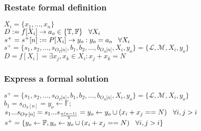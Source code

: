 \documentclass[11pt]{article}
\begin{document}
\subsubsection{Restate formal definition}
\begin{center}
\vspace{1.5mm}
$
X_i = \{x_1,...,x_n\}
$
\\ \vspace{2mm}
$
D := f \lbrack X_i \rbrack \rightarrow a_{o} \in \{\mathbb{T}, \mathbb{F}\} \hspace{3mm} \forall X_i
$
\\ \vspace{2mm}
$
s^+ = s^+\lbrack n \rbrack := P \lbrack X_i \rbrack \rightarrow y_{o} : y_o = a_{o} \hspace{3mm} \forall X_i
$
\\ \vspace{2mm}
$
s^+ = \{ s_1,s_2,...,s_{O_T \lbrack n \rbrack }, b_1, b_2,...,b_{O_S \lbrack n \rbrack},X_i,y_o \} = \{ \mathcal{L},\mathcal{M},X_i,y_o\}
$
\\ \vspace{6mm}
$
D = f[X_i] = \exists x_j,x_k \in X_i : x_j + x_k = N
$
\end{center}

\subsubsection{Express a formal solution}
\begin{center}
\vspace{1.5mm}
$
s^+ = \{ s_1,s_2,...,s_{O_T \lbrack n \rbrack }, b_1, b_2,...,b_{O_S \lbrack n \rbrack},X_i,y_o \} = \{ \mathcal{L},\mathcal{M},X_i,y_o\}
$
\\ \vspace{2mm}
$
b_1 = s_{O_S[n]} = y_o \leftarrow \mathbb{F};
$
\\ \vspace{2mm}
$
s_1 ... s_{O_T[n]} = s_1 ... s_{\frac{n(n-1)}{2}} = y_o \leftarrow y_o \cup (x_i + x_j == N)  \hspace{3mm}  \forall i,j > i
$
\\ \vspace{2mm}
$
s^+ = \{y_o \leftarrow \mathbb{F},y_o \leftarrow y_o \cup (x_i + x_j == N) \hspace{3mm} \forall i,j > i\}
$
\end{center}
\end{document}
